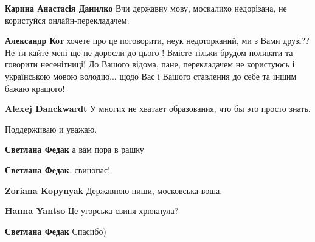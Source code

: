 \begin{itemize}
\begin{itemize}
\textbf{Карина Анастасія Данилко} Вчи державну мову, москалихо недорізана, не
користуйся онлайн-перекладачем.


\textbf{Александр Кот} хочете про це поговорити, неук недоторканий, ми з Вами
друзі?? Не ти-кайте мені ще не доросли до цього ! Вмієте тільки брудом поливати
та говорити несенітниці! До Вашого відома, пане, перекладачем не користуюсь і
українською мовою володію... щодо Вас і Вашого ставлення до себе та іншим бажаю
кращого!


\textbf{Alexej Danckwardt}
У многих не хватает образования, что бы это просто знать.
\end{itemize}


Поддерживаю и уважаю.

\begin{itemize}

\textbf{Светлана Федак} а вам пора в рашку


\textbf{Светлана Федак}, свинопас!


\textbf{Zoriana Kopynyak} Державною пиши, московська воша.


\textbf{Hanna Yantso} Це угорська свиня хрюкнула?


\textbf{Светлана Федак} Спасибо)



\end{itemize}
\end{itemize}
